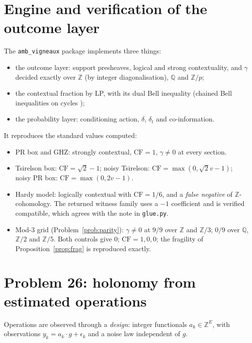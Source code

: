 \documentclass[11pt]{article}
\theoremstyle{definition}
\theoremstyle{remark}
\newcommand{\Z}{\mathbb{Z}}
\newcommand{\Q}{\mathbb{Q}}
\newcommand{\CF}{\mathrm{CF}}
\newcommand{\st}[1]{\textsf{\small\color{gray}#1}}
\begin{document}
\section{Engine and verification of the outcome layer}\label{sec:engine}
The \texttt{amb\_vigneaux} package implements three things:
\begin{itemize}
  \item the outcome layer: support presheaves, logical and strong contextuality, and $\gamma$ decided exactly over $\Z$ (by integer diagonalisation), $\Q$ and $\Z/p$;
  \item the contextual fraction by LP, with its dual Bell inequality (chained Bell inequalities on cycles \cite{bc90});
  \item the probability layer: conditioning action, $\delta$, $\delta_t$ and co-information.
\end{itemize}
It reproduces the standard values \st{computed}:
\begin{itemize}
  \item PR box and GHZ: strongly contextual, $\CF=1$, $\gamma\ne0$ at every section.
  \item Tsirelson box: $\CF=\sqrt2-1$; noisy Tsirelson: $\CF=\max(0,\sqrt2v-1)$; noisy PR box: $\CF=\max(0,2v-1)$.
  \item Hardy model: logically contextual with $\CF=1/6$, and a \emph{false negative} of $\Z$-cohomology. The returned witness family uses a $-1$ coefficient and is verified compatible, which agrees with the note in \texttt{glue.py}.
  \item Mod-3 grid (Problem~\ref{prob:parity}): $\gamma\ne0$ at $9/9$ over $\Z$ and $\Z/3$; $0/9$ over $\Q$, $\Z/2$ and $\Z/5$. Both controls give $0$; $\CF=1,0,0$; the fragility of Proposition~\ref{prop:frag} is reproduced exactly.
\end{itemize}

\section{Problem 26: holonomy from estimated operations}\label{sec:p26}
Operations are observed through a \emph{design}: integer functionals $a_k\in\Z^E$, with observations $y_k=a_k\cdot g+\epsilon_k$ and a noise law independent of $g$.
\end{document}
